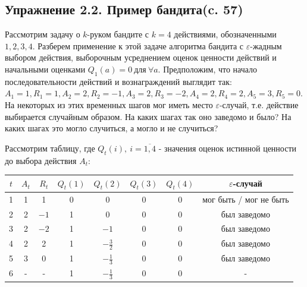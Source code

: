 \subsection{Упражнение 2.2. Пример бандита(c. 57)}
Рассмотрим задачу о $k$-руком бандите с $k = 4$ действиями, обозначенными $1, 2, 3, 4$. Разберем применение к этой задаче алгоритма бандита с $\varepsilon$-жадным выбором действия, выборочным усреднением оценок ценности действий и начальными оценками $Q_1(a) = 0 \ \text{для} \ \forall a$. Предположим,
что начало последовательности действий и вознаграждений выглядит так: $A_1 = 1,
R_1 = 1, A_2 = 2, R_2 = -1, A_3 = 2, R_3 = -2, A_4 = 2, R_4 = 2, A_5 = 3, R_5 = 0$. На некоторых из этих временных шагов мог иметь место $\varepsilon$-случай, т.е. действие выбирается случайным образом. На каких шагах так оно заведомо и было? На каких шагах это могло случиться, а могло и не случиться?
\begin{solution} 
    Рассмотрим таблицу, где $Q_t(i), \ i=\overline{1,4}$ - значения оценок истинной ценности до выбора действия $A_t$:
    \renewcommand{\arraystretch}{1.3}
    \begin{table}[H]
    \centering
    \begin{tabular}{|c|c|c|c|c|c|c|c|}
    \hline
    $t$ 
    & $A_t$ 
    & $R_t$ 
    & $Q_t(1)$ 
    & $Q_t(2)$ 
    & $Q_t(3)$ 
    & $Q_t(4)$ 
    & $\varepsilon$-случай \\ \hline
    1 & 1 & 1 
    & 0 
    & 0 
    & 0 
    & 0 
    & мог быть / мог не быть \\
    \hline
    
    2 & 2 & $-1$ 
    & 1 
    & 0 
    & 0 
    & 0 
    & был заведомо \\
    \hline
    
    3 & 2 & $-2$ 
    & 1 
    & $-1$ 
    & 0 
    & 0 
    & был заведомо \\
    \hline
    
    4 & 2 & 2 
    & 1 
    & $-\frac{3}{2}$ 
    & 0 
    & 0 
    & был заведомо \\
    \hline
    
    5 & 3 & 0 
    & 1 
    & $-\tfrac{1}{3}$ 
    & 0 
    & 0 
    & был заведомо \\
    \hline
    
    6 & - & -
    & 1
    & $-\tfrac{1}{3}$ 
    & 0 
    & 0 
    & - \\
    \hline
    \end{tabular}
    \end{table}
\end{solution}

